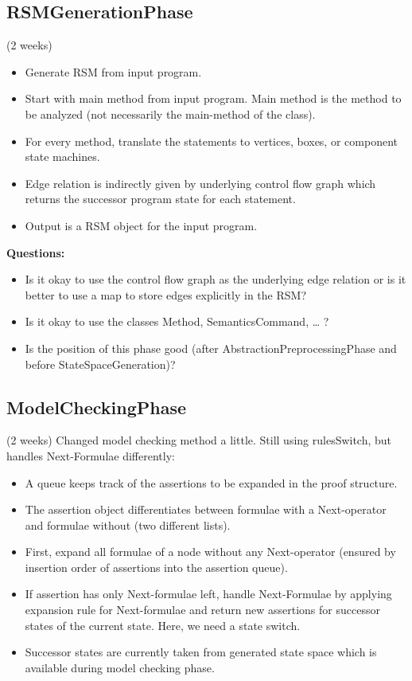 \documentclass[a4paper,12pt]{article}
\begin{document}
\subsection{RSMGenerationPhase}
(2 weeks)
\begin{itemize}
	\item Generate RSM from input program.
	\item Start with main method from input program. Main method is the method to be analyzed (not necessarily the main-method of the class). 
	\item For every method, translate the statements to vertices, boxes, or component state machines. 
	\item Edge relation is indirectly given by underlying control flow graph which returns the successor program state for each statement.
	\item Output is a RSM object for the input program.
\end{itemize}

\textbf{Questions:}
\begin{itemize}
	\item Is it okay to use the control flow graph as the underlying edge relation or is it better to use a map to store edges explicitly in the RSM?
	\item Is it okay to use the classes Method, SemanticsCommand, … ?
	\item Is the position of this phase good (after AbstractionPreprocessingPhase and before StateSpaceGeneration)?
\end{itemize} 


\subsection{ModelCheckingPhase}
(2 weeks)
Changed model checking method a little. Still using rulesSwitch, but handles Next-Formulae differently:
\begin{itemize}
	\item	A queue keeps track of the assertions to be expanded in the proof structure.
	\item	The assertion object differentiates between formulae with a Next-operator and formulae without (two different lists).
	\item	First, expand all formulae of a node without any Next-operator (ensured by insertion order of assertions into the assertion queue).
	\item	If assertion has only Next-formulae left, handle Next-Formulae by applying expansion rule for Next-formulae and return new assertions for successor states of the current state. Here, we need a state switch.
	\item	Successor states are currently taken from generated state space which is available during model checking phase.
\end{itemize}
\end{document}

